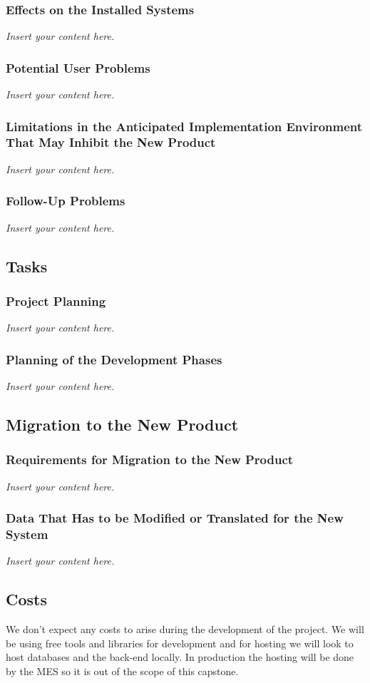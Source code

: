 \documentclass[12pt]{article}
\newcommand{\lips}{\textit{Insert your content here.}}
\begin{document}
\subsubsection{Effects on the Installed Systems}
\lips
\subsubsection{Potential User Problems}
\lips
\subsubsection{Limitations in the Anticipated Implementation Environment That May
Inhibit the New Product}
\lips
\subsubsection{Follow-Up Problems}
\lips

\subsection{Tasks}
\subsubsection{Project Planning}
\lips
\subsubsection{Planning of the Development Phases}
\lips

\subsection{Migration to the New Product}
\subsubsection{Requirements for Migration to the New Product}
\lips
\subsubsection{Data That Has to be Modified or Translated for the New System}
\lips

\subsection{Costs}
We don't expect any costs to arise during the development of the project. We will be using free tools and libraries for development and for hosting we will look to host databases and the back-end locally. In production the hosting will be done by the MES so it is out of the scope of this capstone.
\end{document}
